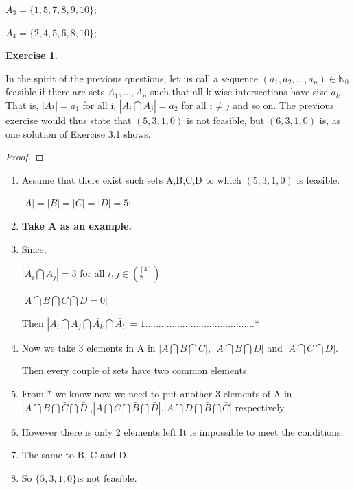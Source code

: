 \documentclass[12pt,a4]{article}
\theoremstyle{exercise}
\newtheorem{exercise}[theorem]{Exercise}
\begin{document}
    $A_3=\{1,5,7,8,9,10\}$;
    
    $A_4=\{2,4,5,6,8,10\}$;
    
\begin{exercise}
\end{exercise}
	In the spirit of the previous questions, let us call a sequence $(a_1,a_2,...,a_n)\in\mathbb{N}_0$ feasible if there are sets $A_1,...,A_n$ such that all k-wise intersections have size $a_k$. That is, $|Ai| = a_{1}$ for all i, $|A_i \bigcap A_j| = a_2$ for all $i \not= j$ and so on. The previous exercise would thus state that $(5, 3, 1, 0)$ is not feasible, but $(6, 3, 1, 0)$ is, as one solution of Exercise 3.1 shows.

\begin{proof}
\end{proof}

\begin{enumerate}
\item Assume that there exist such sets A,B,C,D to which $(5,3,1,0)$ is feasible.

$|A|=|B|=|C|=|D|=5$;


\item \textbf {Take A as an example.}

\item Since,

$|A_i\bigcap A_j| = 3$ for all ${i,j} \in (^{[4]}_{2})$


$|A\bigcap B\bigcap C\bigcap  D = 0|$

Then $|A_i\bigcap A_j \bigcap \bar{A_k}\bigcap \bar{A_l}| = 1$.........................................*

\item Now we take 3 elements in A in $|A\bigcap B\bigcap C|$, $|A\bigcap B\bigcap D|$ and  $|A\bigcap C\bigcap D|$.

Then every couple of sets have two common elements.

\item From * we know now we need to put another 3 elements of A in $|A\bigcap B \bigcap \bar C \bigcap \bar D|$,$|A\bigcap C \bigcap \bar B \bigcap \bar D|$,$|A\bigcap D \bigcap \bar B \bigcap \bar C|$ respectively.

\item However there is only 2 elements left.It is impossible to meet the conditions.

\item The same to B, C and D.
\item So $\{5,3,1,0\}$is not feasible.
\end{enumerate}
\end{document}
